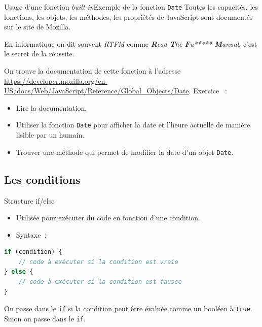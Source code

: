 \documentclass{beamer}
\begin{document}
    \begin{frame}{Usage d'une fonction \textit{built-in}}{Exemple de la fonction \lstinline{Date}}
        Toutes les capacités, les fonctions, les objets, les méthodes, les propriétés de JavaScript sont documentés sur le site de Mozilla.
        \bigbreak
        \begin{dangercolorbox}
            En informatique on dit souvent \textit{RTFM} comme \textit{\textbf{R}ead \textbf{T}he \textbf{F}u***** \textbf{M}anual}, c'est le secret de la réussite.
        \end{dangercolorbox}
        \bigbreak
        On trouve la documentation de cette fonction à l'adresse \url{https://developer.mozilla.org/en-US/docs/Web/JavaScript/Reference/Global_Objects/Date}.
        \bigbreak
        Exercice \execcounterdispinc{}~:
        \begin{itemize}
            \item Lire la documentation.
            \item Utiliser la fonction \lstinline{Date} pour afficher la date et l'heure actuelle
            de manière lisible par un humain.
            \item Trouver une méthode qui permet de modifier la date d'un objet \lstinline{Date}.
        \end{itemize}
    \end{frame}

    \subsection{Les conditions}\label{subsec:conditions}

    \begin{frame}[fragile]{Structure if/else}
        \begin{itemize}
            \item Utilisée pour exécuter du code en fonction d'une condition.
            \item Syntaxe~:
        \end{itemize}
        \begin{lstlisting}[language=JavaScript,title={\tiny{Script JavaScript}}]
if (condition) {
    // code à exécuter si la condition est vraie
} else {
    // code à exécuter si la condition est fausse
}
        \end{lstlisting}
        On passe dans le
        \lstinline{if} si la condition peut être évaluée comme un booléen à \lstinline{true}.
        Sinon on passe dans le \lstinline{if}.
    \end{frame}
\end{document}
